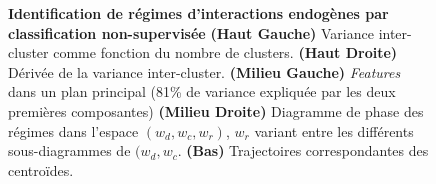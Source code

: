 \begin{figure}
{\textbf{Identification de régimes d'interactions endogènes par classification non-supervisée} \textbf{(Haut Gauche)} Variance inter-cluster comme fonction du nombre de clusters. \textbf{(Haut Droite)} Dérivée de la variance inter-cluster. \textbf{(Milieu Gauche)} \emph{Features} dans un plan principal (81\% de variance expliquée par les deux premières composantes) \textbf{(Milieu Droite)} Diagramme de phase des régimes dans l'espace $(w_{d},w_{c},w_{r})$, $w_r$ variant entre les différents sous-diagrammes de $(w_{d},w_{c}$. \textbf{(Bas)} Trajectoires correspondantes des centroïdes.  
\label{fig:causalityregimes:clustering}}
\end{figure}



